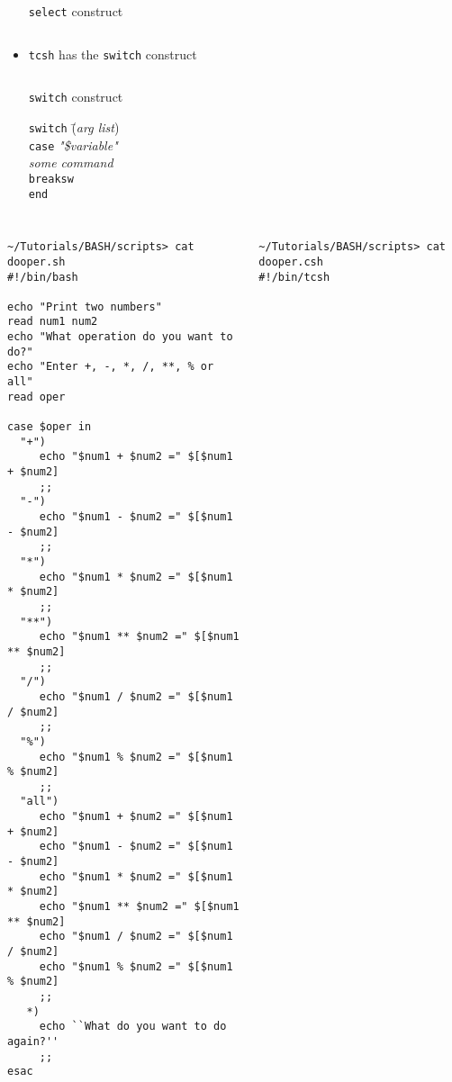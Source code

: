 \documentclass[slidestop,mathserif,compress,xcolor=svgnames]{beamer}
\newenvironment{bblock}[0]
{
\begin{beamerboxesrounded}[upper=uppercol1,lower=lowercol1,shadow=true]}
{\end{beamerboxesrounded}}
\newenvironment{eblock}[0]
{
\begin{beamerboxesrounded}[upper=uppercol2,lower=lowercol2,shadow=true]}
{\end{beamerboxesrounded}}
\begin{document}
\begin{frame}
\begin{itemize}
\begin{columns}
\begin{eblock}{\texttt{select} construct}
      \end{eblock}
    \end{columns}
    \framebreak
    \item \texttt{tcsh} has the \texttt{switch} construct
    \begin{columns}
      \column{5cm}
      \begin{eblock}{\texttt{switch} construct}
        \begin{tabbing}
          \texttt{switch} \=(\textit{arg list})\\
          \texttt{case} \textit{"\$variable"}\\
          \>\textit{some command}\\
          \>\texttt{breaksw}\\
          \texttt{end}
        \end{tabbing}
      \end{eblock}
    \end{columns}
  \end{itemize}
  \framebreak
  \begin{columns}
    \vspace{-0.5cm}
    \begin{eblock}{}
      {\fontsize{4}{5}\selectfont
        \begin{verbatim}
~/Tutorials/BASH/scripts> cat dooper.sh
#!/bin/bash

echo "Print two numbers"
read num1 num2
echo "What operation do you want to do?"
echo "Enter +, -, *, /, **, % or all"
read oper

case $oper in
  "+")
     echo "$num1 + $num2 =" $[$num1 + $num2]
     ;;
  "-")
     echo "$num1 - $num2 =" $[$num1 - $num2]
     ;;
  "*")
     echo "$num1 * $num2 =" $[$num1 * $num2]
     ;;
  "**")
     echo "$num1 ** $num2 =" $[$num1 ** $num2]
     ;;
  "/")
     echo "$num1 / $num2 =" $[$num1 / $num2]
     ;;
  "%")
     echo "$num1 % $num2 =" $[$num1 % $num2]
     ;;
  "all")
     echo "$num1 + $num2 =" $[$num1 + $num2]
     echo "$num1 - $num2 =" $[$num1 - $num2]
     echo "$num1 * $num2 =" $[$num1 * $num2]
     echo "$num1 ** $num2 =" $[$num1 ** $num2]
     echo "$num1 / $num2 =" $[$num1 / $num2]
     echo "$num1 % $num2 =" $[$num1 % $num2]
     ;;
   *)
     echo ``What do you want to do again?''
     ;;
esac
        \end{verbatim}
      }
    \end{eblock}
    \vspace{-0.5cm}
    \begin{bblock}{}
      {\fontsize{4}{4.5}\selectfont
        \begin{verbatim}
~/Tutorials/BASH/scripts> cat dooper.csh
#!/bin/tcsh



\end{verbatim}}
\end{bblock}
\end{columns}
\end{frame}
\end{document}
